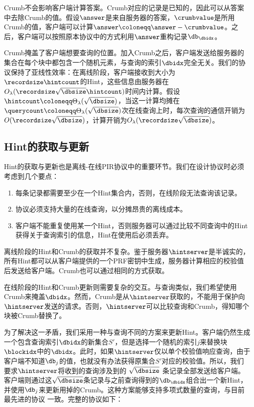 Crumb不会影响客户端计算答案。Crumb对应的记录是已知的，因此可以从答案中去除Crumb的值。假设$\answer$是来自服务器的答案，$\crumbvalue$是所用Crumb的值，客户端可以计算$\answer \coloneqq \answer - \crumbvalue$。之后，客户端可以按照原本协议中的方式利用$\answer$重构记录$\db_\dbidx$。

Crumb掩盖了客户端想要查询的位置。加入Crumb之后，客户端发送给服务器的集合在每个块中都包含一个随机元素，与查询的索引$\dbidx$完全无关。我们的协议保持了亚线性效率：在离线阶段，客户端接收到大小为$\recordsize\hintcount$的Hint，这些信息由服务器在$O_\lambda(\recordsize\sqrt{\dbsize}\hintcount)$时间内计算。假设$\hintcount\coloneqq \Theta_\lambda(\sqrt{\dbsize})$，当这一计算均摊在$\querycount\coloneqq\Theta_\lambda(\sqrt{\dbsize})$次在线查询上时，每次查询的通信开销为$O(\recordsize\sqrt{\dbsize})$，计算开销为$O_\lambda(\recordsize\sqrt{\dbsize})$。

\subsection{Hint的获取与更新}
Hint的获取与更新也是离线-在线PIR协议中的重要环节。我们在设计协议时必须考虑到几个要点：
\begin{enumerate}
    \item 每条记录都需要至少在一个Hint集合内，否则，在线阶段无法查询该记录。
    \item 协议必须支持大量的在线查询，以分摊昂贵的离线成本。
    \item 客户端不能重复使用某一个Hint，否则服务器可以通过比较不同查询中的Hint获得关于查询索引的信息，Hint在使用后必须丢弃。
\end{enumerate}

离线阶段的Hint和Crumb的获取并不复杂。鉴于服务器$\hintserver$是半诚实的，所有Hint都可以从客户端提供的一个PRF密钥中生成，服务器计算相应的校验值后发送给客户端。Crumb也可以通过相同的方式获取。

在线阶段的Hint和Crumb更新则需要复杂的交互。与查询类似，我们希望使用Crumb来掩盖$\dbidx$。然而，Crumb是从$\hintserver$获取的，不能用于保护向$\hintserver$发送的请求。否则，$\hintserver$可以比较查询和Crumb，得知哪个块被Crumb替换了。

为了解决这一矛盾，我们采用一种与查询不同的方案来更新Hint。客户端仍然生成一个包含查询索引$\dbidx$的新集合$S'$，但是选择一个随机的索引$j$来替换块$\blockidx$中的$\dbidx$。此时，如果$\hintserver$仅以单个校验值响应查询，由于客户端不知道$\db_{j}$的值，也就没有办法获得原集合$S'$对应的校验值。所以，我们要求$\hintserver$将收到的查询涉及到的 $\sqrt{\dbsize}$ 条记录全部发送给客户端。客户端则通过这$\sqrt{\dbsize}$条记录与之前查询得到的$\db_\dbidx$组合出一个新Hint，并使用$\db_{j}$来更新用掉的Crumb。这种方案能够支持多项式数量的查询，与目前最先进的协议 \cite{C:LazPap23} 一致。完整的协议如下：

